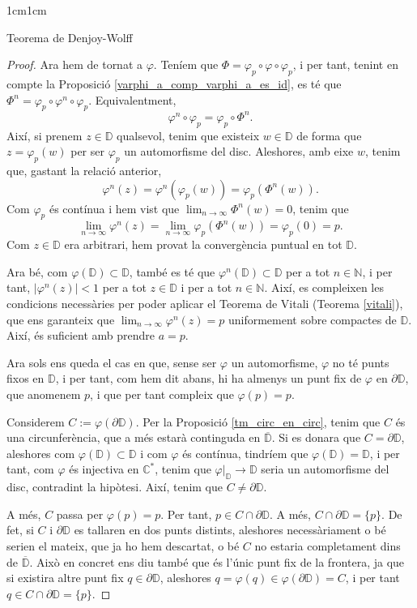 \begin{adjustwidth}{1cm}{1cm}
\begin{subsection}{Teorema de Denjoy-Wolff}
\begin{proof}
        Ara hem de tornat a $\varphi$. Teníem que $\Phi=\varphi_p\circ\varphi\circ\varphi_p$, i per tant, tenint en compte la Proposició \ref{varphi_a_comp_varphi_a_es_id}, es té que $\Phi^n=\varphi_p\circ\varphi^n\circ\varphi_p$. Equivalentment, 
        \[
            \varphi^n\circ\varphi_p=\varphi_p\circ\Phi^n.
        \]
        Així, si prenem $z\in \mathbb{D}$ qualsevol, tenim que existeix $w\in \mathbb{D}$ de forma que $z=\varphi_p(w)$ per ser $\varphi_p$ un automorfisme del disc. Aleshores, amb eixe $w$, tenim que, gastant la relació anterior, 
        \[
            \varphi^n(z)=\varphi^n(\varphi_p(w))=\varphi_p(\Phi^n(w)).
        \]
        Com $\varphi_p$ és contínua i hem vist que $\displaystyle\lim_{n\to\infty}\Phi^n(w)=0$, tenim que 
        \[
            \lim_{n\to\infty}\varphi^n(z)=\lim_{n\to\infty}\varphi_p(\Phi^n(w))=\varphi_p(0)=p.
        \]
        Com $z\in \mathbb{D}$ era arbitrari, hem provat la convergència puntual en tot $\mathbb{D}$.

        Ara bé, com $\varphi(\mathbb{D})\subset \mathbb{D}$, també es té que $\varphi^n(\mathbb{D})\subset \mathbb{D}$ per a tot $n\in\mathbb{N}$, i per tant, $|\varphi^n(z)|<1$ per a tot $z\in \mathbb{D}$ i per a tot $n\in \mathbb{N}$. Així, es compleixen les condicions necessàries per poder aplicar el Teorema de Vitali (Teorema \ref{vitali}), que ens garanteix que $\displaystyle\lim_{n\to\infty}\varphi^n(z)=p$ uniformement sobre compactes de $\mathbb{D}$. Així, és suficient amb prendre $a=p$.

        Ara sols ens queda el cas en que, sense ser $\varphi$ un automorfisme, $\varphi$ no té punts fixos en $\mathbb{D}$, i per tant, com hem dit abans, hi ha almenys un punt fix de $\varphi$ en $\partial \mathbb{D}$, que anomenem $p$, i que per tant compleix que $\varphi(p)=p$.

        Considerem $C:=\varphi(\partial \mathbb{D})$. Per la Proposició \ref{tm_circ_en_circ}, tenim que $C$ és una circunferència, que a més estarà continguda en $\overline{\mathbb{D}}$. Si es donara que $C=\partial \mathbb{D}$, aleshores com $\varphi(\mathbb{D})\subset\mathbb{D}$ i com $\varphi$ és contínua, tindríem que $\varphi(\mathbb{D})=\mathbb{D}$, i per tant, com $\varphi$ és injectiva en $\mathbb{C}^*$, tenim que $\varphi|_{\mathbb{D}}\to \mathbb{D}$ seria un automorfisme del disc, contradint la hipòtesi. Així, tenim que $C\neq \partial \mathbb{D}$.
        
        A més, $C$ passa per $\varphi(p)=p$. Per tant, $p\in C\cap \partial \mathbb{D}$. A més, $C\cap\partial \mathbb{D}=\{p\}$. De fet, si $C$ i $\partial \mathbb{D}$ es tallaren en dos punts distints, aleshores necessàriament o bé serien el mateix, que ja ho hem descartat, o bé $C$ no estaria completament dins de $\overline{\mathbb{D}}$. Això en concret ens diu també que és l'únic punt fix de la frontera, ja que si existira altre punt fix $q\in \partial \mathbb{D}$, aleshores $q=\varphi(q)\in\varphi(\partial \mathbb{D})=C$, i per tant $q\in C\cap \partial \mathbb{D}=\{p\}$.


\end{proof}
\end{subsection}
\end{adjustwidth}
